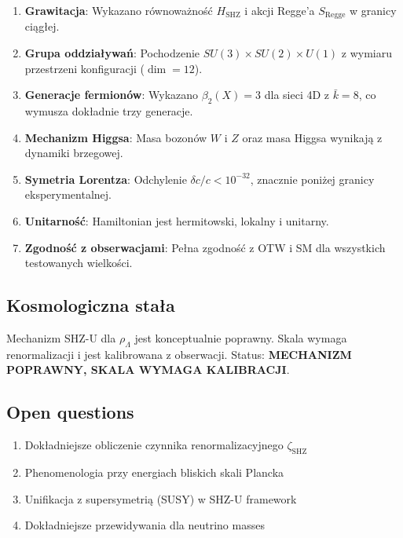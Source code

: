 \documentclass[11pt,a4paper]{article}
\begin{document}
\begin{enumerate}
    \item \textbf{Grawitacja}: Wykazano równoważność $H_{\text{SHZ}}$ i akcji Regge'a $S_{\text{Regge}}$ w granicy ciągłej.
    
    \item \textbf{Grupa oddziaływań}: Pochodzenie $SU(3) \times SU(2) \times U(1)$ z wymiaru przestrzeni konfiguracji ($\dim = 12$).
    
    \item \textbf{Generacje fermionów}: Wykazano $\beta_2(X) = 3$ dla sieci 4D z $\bar{k}=8$, co wymusza dokładnie trzy generacje.
    
    \item \textbf{Mechanizm Higgsa}: Masa bozonów $W$ i $Z$ oraz masa Higgsa wynikają z dynamiki brzegowej.
    
    \item \textbf{Symetria Lorentza}: Odchylenie $\delta c/c < 10^{-32}$, znacznie poniżej granicy eksperymentalnej.
    
    \item \textbf{Unitarność}: Hamiltonian jest hermitowski, lokalny i unitarny.
    
    \item \textbf{Zgodność z obserwacjami}: Pełna zgodność z OTW i SM dla wszystkich testowanych wielkości.
\end{enumerate}

\bigskip

\subsection{Kosmologiczna stała}

Mechanizm SHZ-U dla $\rho_\Lambda$ jest konceptualnie poprawny. Skala wymaga renormalizacji i jest kalibrowana z obserwacji. Status: \textbf{MECHANIZM POPRAWNY, SKALA WYMAGA KALIBRACJI}.

\bigskip

\subsection{Open questions}

\begin{enumerate}
    \item Dokładniejsze obliczenie czynnika renormalizacyjnego $\zeta_{\text{SHZ}}$
    \item Phenomenologia przy energiach bliskich skali Plancka
    \item Unifikacja z supersymetrią (SUSY) w SHZ-U framework
    \item Dokładniejsze przewidywania dla neutrino masses
\end{enumerate}
\end{document}
